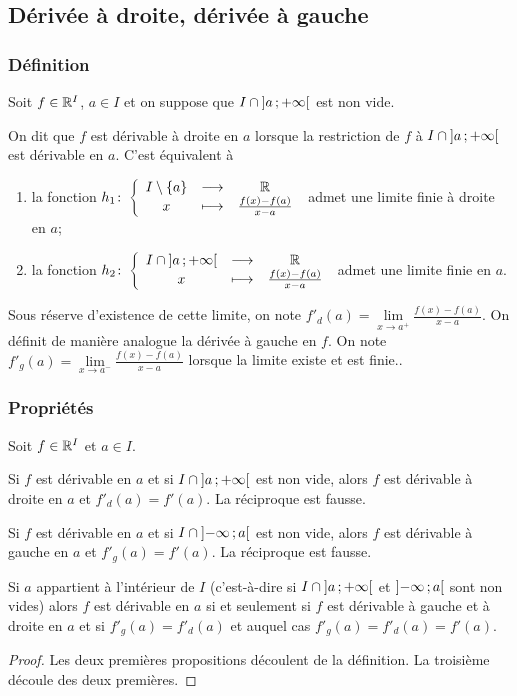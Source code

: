 \subsection{Dérivée à droite, dérivée à gauche}

\subsubsection{Définition}
Soit \(f \in \mathbb{R}^I\), \(a \in I\) et on suppose que \(I \cap \left] a \, ;  +\infty \right[\) est non vide.
\begin{defdef}
  On dit que \(f\) est dérivable à droite en \(a\) lorsque la restriction de \(f\) à \(I \cap \left] a \, ;  +\infty \right[\) est dérivable en \(a\). C'est équivalent à
  \begin{enumerate}
  \item la fonction \(h_1\colon \left\{\begin{array}{ccc} I\setminus\{a\} & \longrightarrow &\mathbb{R}\\ x & \longmapsto & \frac{f(x)-f(a)}{x-a} \end{array} \right.\) admet une limite finie à droite en \(a\);
  \item la fonction \(h_2\colon \left\{\begin{array}{ccc} I \cap \left] a \, ;  +\infty \right[ & \longrightarrow &\mathbb{R}\\ x & \longmapsto & \frac{f(x)-f(a)}{x-a} \end{array} \right.\) admet une limite finie en \(a\).
  \end{enumerate}
  Sous réserve d'existence de cette limite, on note \(f'_d(a) = \lim\limits_{x \to a^+}\frac{f(x)-f(a)}{x-a}\). On définit de manière analogue la dérivée à gauche en \(f\). On note \(f'_g(a) = \lim\limits_{x \to a^-}\frac{f(x)-f(a)}{x-a}\) lorsque la limite existe et est finie..
\end{defdef}

\subsubsection{Propriétés}

Soit \(f \in \mathbb{R}^I\) et \(a \in I\).
\begin{prop}
  Si \(f\) est dérivable en \(a\) et si \(I\cap \left] a \, ;  +\infty \right[\) est non vide, alors \(f\) est dérivable à droite en \(a\) et \(f'_d(a)=f'(a)\). La réciproque est fausse.
\end{prop}
\begin{prop}
  Si \(f\) est dérivable en \(a\) et si \(I\cap \left] -\infty \, ;  a \right[\) est non vide, alors \(f\) est dérivable à gauche en \(a\) et \(f'_g(a)=f'(a)\). La réciproque est fausse.
\end{prop}
\begin{prop}
  Si \(a\) appartient à l'intérieur de \(I\) (c'est-à-dire si \(I\cap \left] a \, ;  +\infty \right[\) et \(\left] -\infty \, ;  a \right[\) sont non vides) alors \(f\) est dérivable en \(a\) si et seulement si \(f\) est dérivable à gauche et à droite en \(a\) et si \(f'_g(a) = f'_d(a)\) et auquel cas \(f'_g(a)=f'_d(a)=f'(a)\).
\end{prop}
\begin{proof}
  Les deux premières propositions découlent de la définition. La troisième découle des deux premières.
\end{proof}

